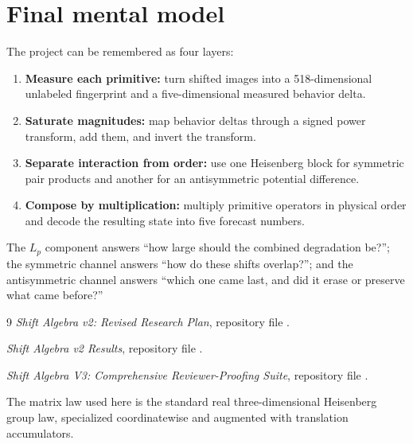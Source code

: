 \documentclass[11pt,a4paper]{article}
\begin{document}
\section{Final mental model}

The project can be remembered as four layers:
\begin{enumerate}
  \item \textbf{Measure each primitive:} turn shifted images into a
  518-dimensional unlabeled fingerprint and a five-dimensional measured
  behavior delta.
  \item \textbf{Saturate magnitudes:} map behavior deltas through a signed
  power transform, add them, and invert the transform.
  \item \textbf{Separate interaction from order:} use one Heisenberg block for
  symmetric pair products and another for an antisymmetric potential
  difference.
  \item \textbf{Compose by multiplication:} multiply primitive operators in
  physical order and decode the resulting state into five forecast numbers.
\end{enumerate}
The $L_p$ component answers ``how large should the combined degradation be?'';
the symmetric channel answers ``how do these shifts overlap?''; and the
antisymmetric channel answers ``which one came last, and did it erase or
preserve what came before?''

\begin{thebibliography}{9}
\textit{Shift Algebra v2: Revised Research Plan}, repository file
.

\textit{Shift Algebra v2 Results}, repository file
.

\textit{Shift Algebra V3: Comprehensive Reviewer-Proofing Suite}, repository
file .

The matrix law used here is the standard real three-dimensional Heisenberg
group law, specialized coordinatewise and augmented with translation
accumulators.
\end{thebibliography}
\end{document}

